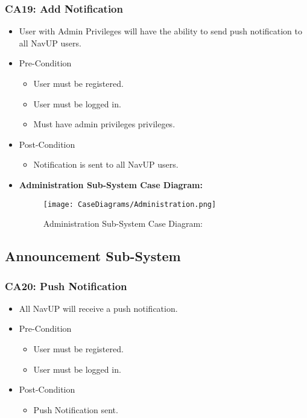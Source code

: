 \documentclass[12pt,a4paper]{article}
\begin{document}
		\subsubsection{CA19: Add Notification}
			\begin{itemize}
				\item User with Admin Privileges will have the ability to send push notification to all NavUP users.
					\item Pre-Condition
						\begin{itemize}
							\item User must be registered.
							\item User must be logged in.
							\item Must have admin privileges privileges.
						\end{itemize}
					\item Post-Condition
						\begin{itemize}
							\item Notification is sent to all NavUP users.
						\end{itemize}
				\item \textbf{Administration Sub-System Case Diagram:}
				\begin{figure}[H]
					\texttt{[image: CaseDiagrams/Administration.png]}
					\caption{Administration Sub-System Case Diagram:}
				\end{figure}
			\end{itemize}
	\subsection{Announcement Sub-System}
		\subsubsection{CA20: Push Notification}
			\begin{itemize}
				\item All NavUP will receive a push notification.
					\item Pre-Condition
						\begin{itemize}
							\item User must be registered.
							\item User must be logged in.
						\end{itemize}
					\item Post-Condition
						\begin{itemize}
							\item Push Notification sent.
						\end{itemize}
			\end{itemize}
\end{document}
